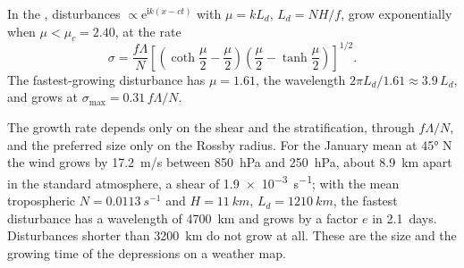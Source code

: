 \begin{theorem}\label{thm:b3:atmospheric-dynamics:eady}
In the , disturbances $\propto \mathrm e^{\mathrm ik(x - ct)}$
with $\mu = kL_d$, $L_d = NH/f$, grow exponentially when $\mu < \mu_c =
2.40$, at the rate
\[
\sigma = \frac{f\Lambda}{N}\left[\left(\coth\frac{\mu}{2} - \frac{\mu}{2}\right)\left(\frac{\mu}{2} - \tanh\frac{\mu}{2}\right)\right]^{1/2} .
\]
The fastest-growing disturbance has $\mu = 1.61$, the wavelength $2\pi L_d/1.61
\approx 3.9\,L_d$, and grows at $\sigma_{\max} = 0.31\,f\Lambda/N$.
\end{theorem}
\admitted

The growth rate depends only on the shear and the stratification, through
$f\Lambda/N$, and the preferred size only on the Rossby radius. For the
January mean at \ang{45} N the wind grows by \qty{17.2}{m/s} between
\qty{850}{hPa} and \qty{250}{hPa}, about \qty{8.9}{km} apart in the
standard atmosphere, a shear of \qty{1.9e-3}{s^{-1}}; with the mean
tropospheric $N = \qty{0.0113}{s^{-1}}$ and $H = \qty{11}{km}$, $L_d =
\qty{1210}{km}$, the fastest disturbance has a wavelength of \qty{4700}{km}
and grows by a factor $e$ in \num{2.1}~days. Disturbances shorter than
\qty{3200}{km} do not grow at all. These are the size and the growing time of
the depressions on a weather map.

